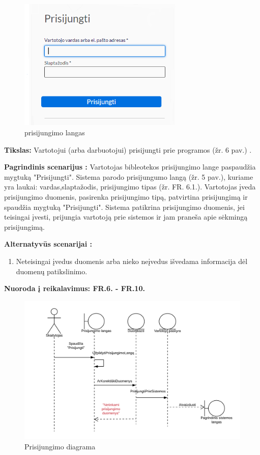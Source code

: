 \documentclass{VUMIFPSkursinis}
\begin{document}
\begin{figure}[H]
\label{fig:prslang}
    \centering
    \includegraphics[width=0.7\textwidth]{vidines/ucprisijungti}
	\caption{prisijungimo langas}
\end{figure}

	\textbf{Tikslas:} Vartotojui (arba darbuotojui) prisijungti prie programos (žr. 6 pav.) .

	\textbf{Pagrindinis scenarijus :} Vartotojas bibleotekos prisijungimo lange paspaudžia mygtuką "Prisijungti".
Sistema parodo prisijungumo langą (žr. 5 pav.), kuriame yra laukai: vardas,slaptažodis, prisijungimo tipas (žr. FR. 6.1.). Vartotojas įveda prisijungimo duomenis, pasirenka prisijungimo tipą, patvirtina prisijungimą ir spaudžia mygtuką "Prisijungti". Sistema patikrina prisijungimo duomenis, jei teisingai įvesti, prijungia vartotoją prie sistemos ir jam praneša apie sėkmingą prisijungimą.

	\textbf{Alternatyvūs scenarijai :} 
    	\begin{enumerate}
			\item Neteisingai įvedus duomenis arba nieko neįvedus išvedama informacija dėl duomenų 	   	 	  					patikslinimo.
		\end{enumerate} 


	\textbf{Nuoroda į reikalavimus: FR.6. - FR.10.}
    
\begin{figure}[H]
\label{fig:logindiag}
    \centering
    \includegraphics[width=1\textwidth]{Sekos_diagramos/SD_Prisijungimas}   
	\caption{Prisijungimo diagrama}
\end{figure}
\end{document}
